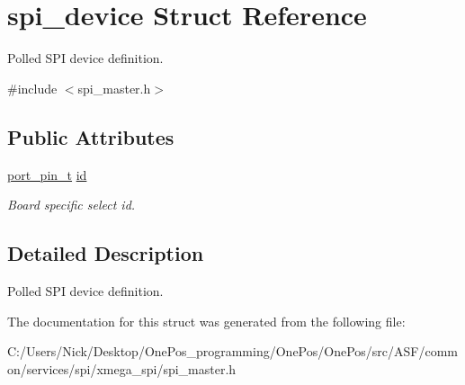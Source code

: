 \hypertarget{structspi__device}{\section{spi\-\_\-device Struct Reference}
\label{structspi__device}
}


Polled S\-P\-I device definition.  




{\ttfamily \#include $<$spi\-\_\-master.\-h$>$}

\subsection*{Public Attributes}
\begin{DoxyCompactItemize}
\item 
\hypertarget{structspi__device_a46fd65e51a4d6c4d6056639a4f154186}{\hyperlink{ioport__compat_8h_ac219d604c520dca5681bf4d7c2855d6c}{port\-\_\-pin\-\_\-t} \hyperlink{structspi__device_a46fd65e51a4d6c4d6056639a4f154186}{id}}\label{structspi__device_a46fd65e51a4d6c4d6056639a4f154186}

\begin{DoxyCompactList}\small\item\em Board specific select id. \end{DoxyCompactList}\end{DoxyCompactItemize}


\subsection{Detailed Description}
Polled S\-P\-I device definition. 

The documentation for this struct was generated from the following file\-:\begin{DoxyCompactItemize}
\item 
C\-:/\-Users/\-Nick/\-Desktop/\-One\-Pos\-\_\-programming/\-One\-Pos/\-One\-Pos/src/\-A\-S\-F/common/services/spi/xmega\-\_\-spi/spi\-\_\-master.\-h\end{DoxyCompactItemize}
